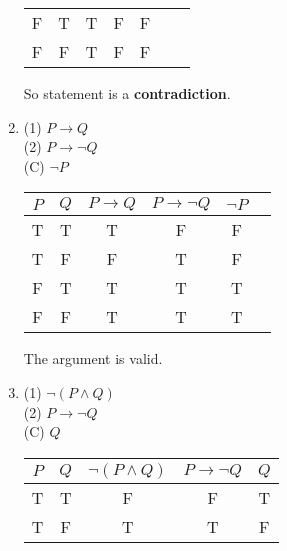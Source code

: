 \documentclass{article}
\begin{document}
\begin{enumerate}
\begin{center}
\begin{tabular}{c|c|c|c|c|c|c}
                        F   & T   & T                                  & F                                   & F                                                                   \\
                        F   & F   & T                                  & F                                   & F                                                                   \\
                  \end{tabular}
            \end{center}
            So statement is a \textbf{contradiction}.
      \item (1) $P \to Q$\\
            (2) $P \to \neg Q$\\
            (C) $\neg P$\\
            \begin{center}
                  \begin{tabular}{c|c|c|c|c|c}
                        $P$ & $Q$ & $P \to Q$ & $P \to \neg Q$ & $\neg P$ \\
                        \hline
                        T   & T   & T         & F              & F        \\
                        T   & F   & F         & T              & F        \\
                        F   & T   & T         & T              & T        \\
                        F   & F   & T         & T              & T        \\
                  \end{tabular}
            \end{center}
            The argument is valid.
      \item (1) $\neg(P \land Q)$\\
            (2) $P \to \neg Q$\\
            (C) $Q$\\
            \begin{center}
                  \begin{tabular}{c|c|c|c|c}
                        $P$ & $Q$ & $\neg(P \land Q)$ & $P \to \neg Q$ & $Q$ \\
                        \hline
                        T   & T   & F                 & F              & T   \\
                        T   & F   & T                 & T              & F   \\

\end{tabular}
\end{center}
\end{enumerate}
\end{document}
